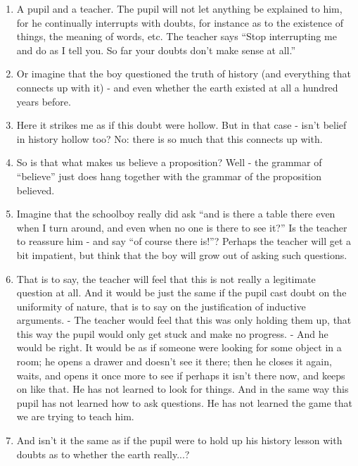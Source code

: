 \documentclass{book}
\begin{document}
\begin{enumerate}
\item
A pupil and a teacher. The pupil will not let anything be explained to him, for
he continually interrupts with doubts, for instance as to the existence of
things, the meaning of words, etc. The teacher says ``Stop interrupting me and
do as I tell you. So far your doubts don't make sense at all.''

\item
Or imagine that the boy questioned the truth of history (and everything that
connects up with it) - and even whether the earth existed at all a hundred
years before.

\item
Here it strikes me as if this doubt were hollow. But in that case - isn't
belief in history hollow too? No: there is so much that this connects up with.

\item
So is that what makes us believe a proposition? Well - the grammar of
``believe'' just does hang together with the grammar of the proposition
believed.

\item
Imagine that the schoolboy really did ask ``and is there a table there even
when I turn around, and even when no one is there to see it?'' Is the teacher
to reassure him - and say ``of course there is!''?  Perhaps the teacher will
get a bit impatient, but think that the boy will grow out of asking such
questions.

\item
That is to say, the teacher will feel that this is not really a legitimate
question at all.  And it would be just the same if the pupil cast doubt on the
uniformity of nature, that is to say on the justification of inductive
arguments. - The teacher would feel that this was only holding them up, that
this way the pupil would only get stuck and make no progress. - And he would be
right. It would be as if someone were looking for some object in a room; he
opens a drawer and doesn't see it there; then he closes it again, waits, and
opens it once more to see if perhaps it isn't there now, and keeps on like
that. He has not learned to look for things. And in the same way this pupil has
not learned how to ask questions. He has not learned the game that we are
trying to teach him.

\item
And isn't it the same as if the pupil were to hold up his history lesson with
doubts as to whether the earth really...?


\end{enumerate}
\end{document}
